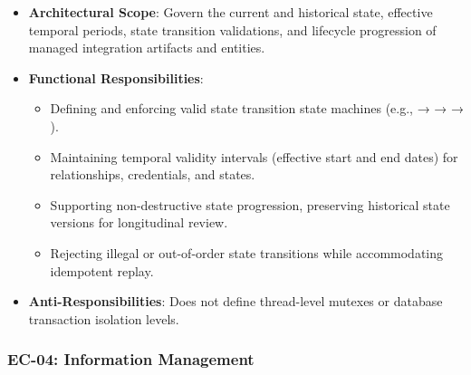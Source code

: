 \begin{itemize}

\item
\textbf{Architectural Scope}: Govern the current and historical state, effective temporal periods, state transition validations, and lifecycle progression of managed integration artifacts and entities.



\item
\textbf{Functional Responsibilities}:


\begin{itemize}

\item
Defining and enforcing valid state transition state machines (e.g., \texttt{} → \texttt{} → \texttt{} → \texttt{}).



\item
Maintaining temporal validity intervals (effective start and end dates) for relationships, credentials, and states.



\item
Supporting non-destructive state progression, preserving historical state versions for longitudinal review.



\item
Rejecting illegal or out-of-order state transitions while accommodating idempotent replay.



\end{itemize}


\item
\textbf{Anti-Responsibilities}: Does not define thread-level mutexes or database transaction isolation levels.



\end{itemize}
\label{rad:enterprise:130}
\subsubsection*{EC-04: Information Management}
\label{rad:enterprise:131}

